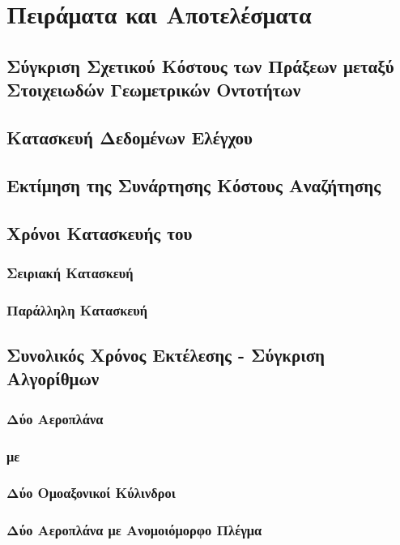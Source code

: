 \chapter{Πειράματα και Αποτελέσματα}
\label{ch:experiments}

\section{Σύγκριση Σχετικού Κόστους των Πράξεων μεταξύ Στοιχειωδών Γεωμετρικών Οντοτήτων}

\section{Κατασκευή Δεδομένων Ελέγχου}

\section{Εκτίμηση της Συνάρτησης Κόστους Αναζήτησης}

\section{Χρόνοι Κατασκευής του }
\subsection{Σειριακή Κατασκευή}
\subsection{Παράλληλη Κατασκευή}

\section{Συνολικός Χρόνος Εκτέλεσης - Σύγκριση Αλγορίθμων}
\subsection{Δύο Αεροπλάνα}
\subsection{ με }
\subsection{Δύο Ομοαξονικοί Κύλινδροι}
\subsection{Δύο Αεροπλάνα με Ανομοιόμορφο Πλέγμα}